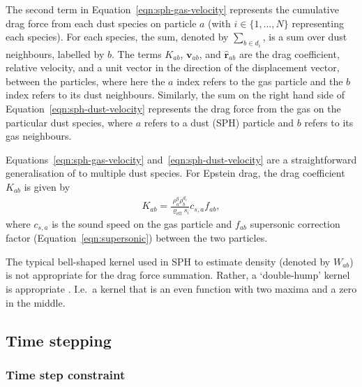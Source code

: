 \documentclass[fleqn,usenatbib]{mnras}
\let\vec\mathbf
\begin{document}
The second term in Equation~\ref{eqn:sph-gas-velocity} represents the cumulative
drag force from each dust species on particle \(a\) (with \(i \in \{1, \ldots,
N\}\) representing each species). For each species, the sum, denoted by
\(\sum_{b \in d_i}\), is a sum over dust neighbours, labelled by \(b\). The
terms \(K_{ab}\), \(\vec{v}_{ab}\), and \(\hat{\vec{r}}_{ab}\) are the drag
coefficient, relative velocity, and a unit vector in the direction of the
displacement vector, between the particles, where here the \(a\) index refers to
the gas particle and the \(b\) index refers to its dust neighbours. Similarly,
the sum on the right hand side of Equation~\ref{eqn:sph-dust-velocity}
represents the drag force from the gas on the particular dust species, where
\(a\) refers to a dust (SPH) particle and \(b\) refers to its gas neighbours.

Equations~\ref{eqn:sph-gas-velocity} and~\ref{eqn:sph-dust-velocity} are a
straightforward generalisation of \citet{Laibe2012MNRAS.420.2345L} to multiple
dust species. For Epstein drag, the drag coefficient \(K_{ab}\) is given by
%
\begin{align}
   K_{ab} = \frac{\rho^g_a \rho^{d_i}_b}{\varrho_{\mathrm{eff}} s_i} c_{s,a} f_{ab},
\end{align}
%
where \(c_{s,a}\) is the sound speed on the gas particle and \(f_{ab}\)
supersonic correction factor (Equation~\ref{eqn:supersonic}) between the two
particles.

The typical bell-shaped kernel used in SPH to estimate density (denoted by
\(W_{ab}\)) is not appropriate for the drag force summation. Rather, a
`double-hump' kernel is appropriate \citep{Laibe2012MNRAS.420.2345L}. I.e.\ a
kernel that is an even function with two maxima and a zero in the middle.

\subsection{Time stepping}

\subsubsection{Time step constraint}
\end{document}
